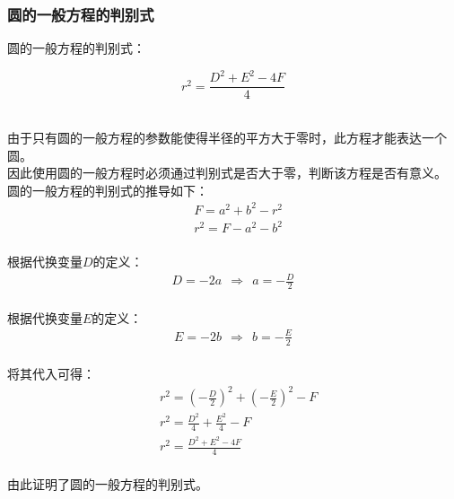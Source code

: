 \documentclass[UTF8]{ctexart}
\begin{document}
\subsubsection{圆的一般方程的判别式}
    圆的一般方程的判别式：
    \begin{large}
        \begin{equation*}
            r^2=\frac{D^2+E^2-4F}{4}
        \end{equation*}
    \end{large}\\
    由于只有圆的一般方程的参数能使得半径的平方大于零时，此方程才能表达一个圆。\\[3mm]
    因此使用圆的一般方程时必须通过判别式是否大于零，判断该方程是否有意义。\\[3mm]
    圆的一般方程的判别式的推导如下：
    \setcounter{equation}{0}
    \begin{align}
        &F=a^2+b^2-r^2\\[4mm]
        &r^2=F-a^2-b^2
    \end{align}\\
    根据代换变量$D$的定义：
    \begin{align}
        D=-2a~~\Rightarrow~~a=-\frac{D}{2}
    \end{align}\\
    根据代换变量$E$的定义：
    \begin{align}
        E=-2b~~\Rightarrow~~b=-\frac{E}{2}
    \end{align}\\
    将其代入可得：
    \begin{align}
        &r^2=\left(-\frac{D}{2}\right)^2+\left(-\frac{E}{2}\right)^2-F\\[4mm]
        &r^2=\frac{D^2}{4}+\frac{E^2}{4}-F\\[4mm]
        &r^2=\frac{D^2+E^2-4F}{4}        
    \end{align}\\
    由此证明了圆的一般方程的判别式。 
    
\newpage
\end{document}
